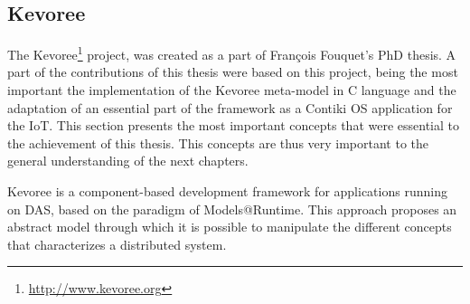 
\subsection{Kevoree}
The Kevoree\footnote{\url{http://www.kevoree.org}} project, was created as a part of Fran{\c{c}}ois Fouquet's PhD thesis.
A part of the contributions of this thesis were based on this project, being the most important the implementation of the Kevoree meta-model in C language and the adaptation of an essential part of the framework as a Contiki OS\cite{dunkels2004contiki} application for the IoT.
This section presents the most important concepts that were essential to the achievement of this thesis.
This concepts are thus very important to the general understanding of the next chapters.

Kevoree is a component-based development framework for applications running on DAS, based on the paradigm of Models@Runtime.
This approach proposes an abstract model through which it is possible to manipulate the different concepts that characterizes a distributed system.

